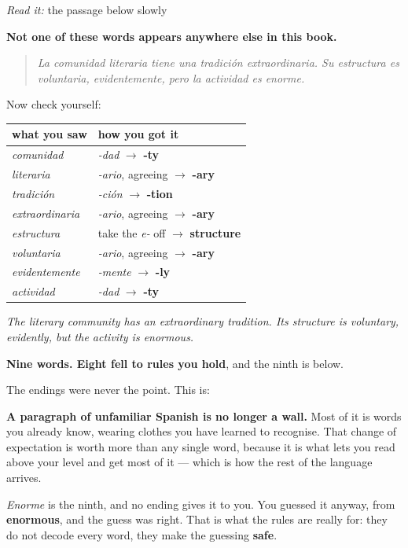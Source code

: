 \begin{grammarlens}[title={What you've built}]
\emph{Read it:} the passage below slowly

\textbf{Not one of these words appears anywhere else in this book.}

\begin{quote}
\emph{La comunidad literaria tiene una tradición extraordinaria. Su estructura es} \emph{voluntaria, evidentemente, pero la actividad es enorme.}
\end{quote}

Now check yourself:

\noindent
\begin{tabularx}{\linewidth}{@{}>{\raggedright\arraybackslash}X>{\raggedright\arraybackslash}X@{}}
\toprule
\textbf{what you saw} & \textbf{how you got it} \\
\midrule
\emph{comunidad} & \emph{-dad} $\to$ \textbf{-ty} \\
\emph{literaria} & \emph{-ario}, agreeing $\to$ \textbf{-ary} \\
\emph{tradición} & \emph{-ción} $\to$ \textbf{-tion} \\
\emph{extraordinaria} & \emph{-ario}, agreeing $\to$ \textbf{-ary} \\
\emph{estructura} & take the \emph{e-} off $\to$ \textbf{structure} \\
\emph{voluntaria} & \emph{-ario}, agreeing $\to$ \textbf{-ary} \\
\emph{evidentemente} & \emph{-mente} $\to$ \textbf{-ly} \\
\emph{actividad} & \emph{-dad} $\to$ \textbf{-ty} \\
\bottomrule
\end{tabularx}

\emph{The literary community has an extraordinary tradition. Its structure is voluntary, evidently, but the activity is enormous.}

\textbf{Nine words. Eight fell to rules you hold}, and the ninth is below.
\end{grammarlens}

\begin{grammarlens}[title={Grammar Lens: what actually changed}]
The endings were never the point. This is:

\textbf{A paragraph of unfamiliar Spanish is no longer a wall.} Most of it is words you already know, wearing clothes you have learned to recognise. That change of expectation is worth more than any single word, because it is what lets you read above your level and get most of it — which is how the rest of the language arrives.

\emph{Enorme} is the ninth, and no ending gives it to you. You guessed it anyway, from \textbf{enormous}, and the guess was right. That is what the rules are really for: they do not decode every word, they make the guessing \textbf{safe}.
\end{grammarlens}

